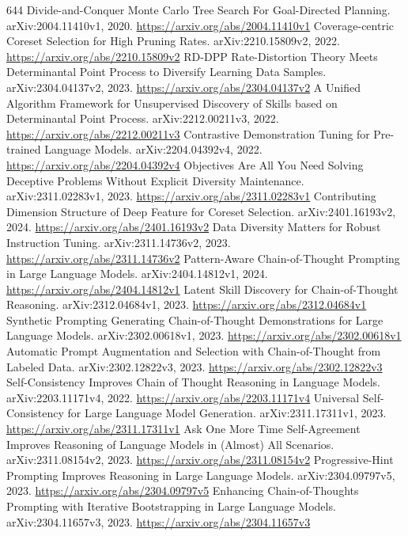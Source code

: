 \documentclass[11pt]{article}
\begin{document}
\begin{thebibliography}{644}
 Divide-and-Conquer Monte Carlo Tree Search For Goal-Directed Planning. arXiv:2004.11410v1, 2020. \url{https://arxiv.org/abs/2004.11410v1}
 Coverage-centric Coreset Selection for High Pruning Rates. arXiv:2210.15809v2, 2022. \url{https://arxiv.org/abs/2210.15809v2}
 RD-DPP Rate-Distortion Theory Meets Determinantal Point Process to Diversify Learning Data Samples. arXiv:2304.04137v2, 2023. \url{https://arxiv.org/abs/2304.04137v2}
 A Unified Algorithm Framework for Unsupervised Discovery of Skills based on Determinantal Point Process. arXiv:2212.00211v3, 2022. \url{https://arxiv.org/abs/2212.00211v3}
 Contrastive Demonstration Tuning for Pre-trained Language Models. arXiv:2204.04392v4, 2022. \url{https://arxiv.org/abs/2204.04392v4}
 Objectives Are All You Need Solving Deceptive Problems Without Explicit Diversity Maintenance. arXiv:2311.02283v1, 2023. \url{https://arxiv.org/abs/2311.02283v1}
 Contributing Dimension Structure of Deep Feature for Coreset Selection. arXiv:2401.16193v2, 2024. \url{https://arxiv.org/abs/2401.16193v2}
 Data Diversity Matters for Robust Instruction Tuning. arXiv:2311.14736v2, 2023. \url{https://arxiv.org/abs/2311.14736v2}
 Pattern-Aware Chain-of-Thought Prompting in Large Language Models. arXiv:2404.14812v1, 2024. \url{https://arxiv.org/abs/2404.14812v1}
 Latent Skill Discovery for Chain-of-Thought Reasoning. arXiv:2312.04684v1, 2023. \url{https://arxiv.org/abs/2312.04684v1}
 Synthetic Prompting Generating Chain-of-Thought Demonstrations for Large Language Models. arXiv:2302.00618v1, 2023. \url{https://arxiv.org/abs/2302.00618v1}
 Automatic Prompt Augmentation and Selection with Chain-of-Thought from Labeled Data. arXiv:2302.12822v3, 2023. \url{https://arxiv.org/abs/2302.12822v3}
 Self-Consistency Improves Chain of Thought Reasoning in Language Models. arXiv:2203.11171v4, 2022. \url{https://arxiv.org/abs/2203.11171v4}
 Universal Self-Consistency for Large Language Model Generation. arXiv:2311.17311v1, 2023. \url{https://arxiv.org/abs/2311.17311v1}
 Ask One More Time Self-Agreement Improves Reasoning of Language Models in (Almost) All Scenarios. arXiv:2311.08154v2, 2023. \url{https://arxiv.org/abs/2311.08154v2}
 Progressive-Hint Prompting Improves Reasoning in Large Language Models. arXiv:2304.09797v5, 2023. \url{https://arxiv.org/abs/2304.09797v5}
 Enhancing Chain-of-Thoughts Prompting with Iterative Bootstrapping in Large Language Models. arXiv:2304.11657v3, 2023. \url{https://arxiv.org/abs/2304.11657v3}

\end{thebibliography}
\end{document}
